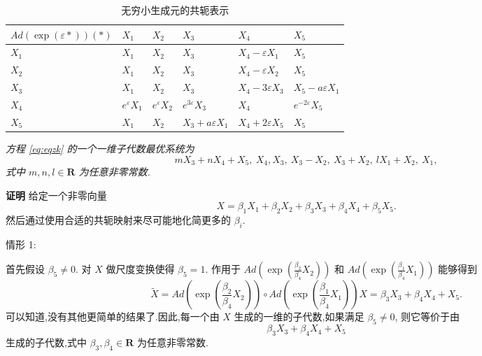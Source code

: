 \begin{table}[!h]
\centering
\caption{{无穷小生成元的共轭表示}}
\label{tab:table1}
\begin{tabularx}{\linewidth}{XXXXXX}
\toprule
$Ad(\exp(\varepsilon *))(*)$&$X_{1}$&$X_{2}$&$X_{3}$&$X_{4}$&$X_{5}$\\
\midrule
$X_{1}$&$X_{1}$&$X_{2}$&$X_{3}$&$X_{4}-\varepsilon X_{1}$&$X_{5}$\\
$X_{2}$&$X_{1}$&$X_{2}$&$X_{3}$&$X_{4}-\varepsilon X_{2}$&$X_{5}$\\
$X_{3}$&$X_{1}$&$X_{2}$&$X_{3}$&$X_{4}-3\varepsilon X_{3}$&$X_{5}-a\varepsilon X_{1}$\\
$X_{4}$&$e^{\varepsilon}X_{1}$&$e^{\varepsilon}X_{2}$&$e^{3\varepsilon}X_{3}$&$X_{4}$&$e^{-2\varepsilon}X_{5}$\\
$X_{5}$&$X_{1}$&$X_{2}$&$X_{3}+a\varepsilon X_{1}$&$X_{4}+2\varepsilon X_{5}$&$X_{5}$\\
\bottomrule
\end{tabularx}
\end{table}

\begin{theorem}
\emph{方程 \eqref{eq:eqzk} 的一个一维子代数最优系统为
\begin{equation*}
	mX_{3}+nX_{4}+X_{5},~ X_{4}, X_{3},~ X_{3}-X_{2}, ~X_{3}+X_{2}, ~lX_{1}+X_{2}, ~X_{1},
\end{equation*}
式中 $m,n,l\in \mathbf{R}$ 为任意非零常数.}
\end{theorem}

{\textbf{证明}} 给定一个非零向量
\begin{equation*}
	X=\beta_{1}X_{1}+\beta_{2}X_{2}+\beta_{3}X_{3}+\beta_{4}X_{4}+\beta_{5}X_{5}.
\end{equation*}
然后通过使用合适的共轭映射来尽可能地化简更多的 $\beta_i$.

情形 1:

首先假设 $\beta_5\neq 0.$ 对 $X$ 做尺度变换使得 $\beta_5=1$. 作用于 $Ad(\exp{(\frac{\beta_2}{\beta_4} X_2)})$ 和 $Ad(\exp{(\frac{\beta_1}{\beta_4} X_1)})$ 能够得到
\begin{equation*}
	\widetilde{X}=Ad(\exp{(\frac{\beta_2}{\beta_4} X_2)})\circ Ad(\exp{(\frac{\beta_1}{\beta_4} X_1)}) X=\beta_{3}X_{3}+\beta_{4}X_{4}+X_{5}.
\end{equation*}
可以知道,没有其他更简单的结果了.因此,每一个由 $X$ 生成的一维的子代数,如果满足 $\beta_5\neq 0 $, 则它等价于由
\begin{equation*}
	\beta_{3}X_{3}+\beta_{4}X_{4}+X_{5}
\end{equation*}
生成的子代数,式中 $\beta_{3}, \beta_{4} \in \mathbf{R}$ 为任意非零常数.

